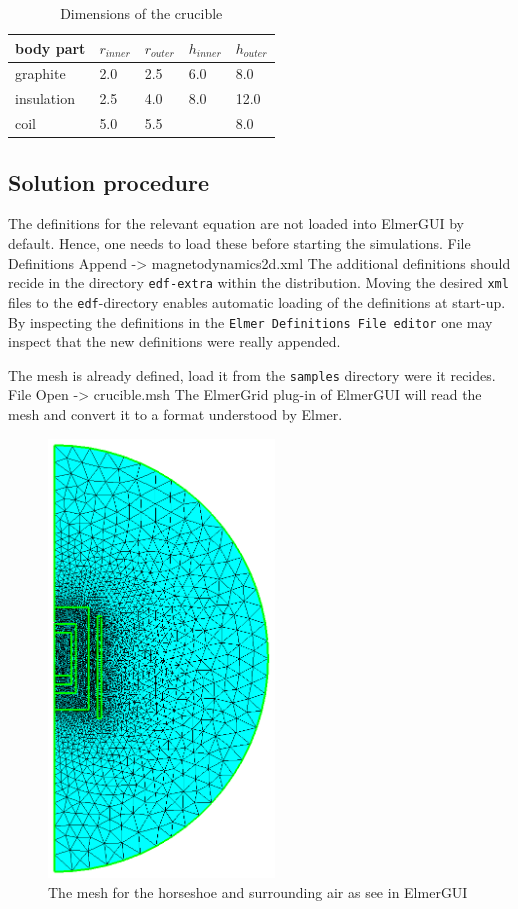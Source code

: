 \begin{table}
\caption{Dimensions of the crucible}
\label{tab:ind_heat_b}
\begin{center}
\begin{tabular}{lllll} \hline
body part &  $r_{inner}$ & $r_{outer}$ & $h_{inner}$ & $h_{outer}$ \\ \hline
graphite  &  2.0   &  2.5 & 6.0 & 8.0 \\
insulation &  2.5   &  4.0 & 8.0 & 12.0 \\
coil      &  5.0   & 5.5  &     & 8.0  \\ \hline
\end{tabular}
\end{center}
\end{table}

\subsection*{Solution procedure}

The definitions for the relevant equation are not loaded into ElmerGUI by default. Hence, 
one needs to load these before starting the simulations.
\ttbegin
File 
  Definitions
    Append -> magnetodynamics2d.xml
\ttend
The additional definitions should recide in the directory \texttt{edf-extra} within the distribution.
Moving the desired \texttt{xml} files to the \texttt{edf}-directory enables automatic loading of the 
definitions at start-up. By inspecting the definitions in the \texttt{Elmer Definitions File editor} one
may inspect that the new definitions were really appended. 

The mesh is already defined, load it from the \texttt{samples} directory were it recides.
\ttbegin
File 
  Open -> crucible.msh
\ttend
The ElmerGrid plug-in of ElmerGUI will read the mesh and convert it to a format understood by Elmer. 

\begin{figure}[h]
\centering
\includegraphics[width=60mm]{crucible_mesh}
\caption{The mesh for the horseshoe and surrounding air as see in ElmerGUI}\label{fg:crucible_mesh}
\end{figure}  


